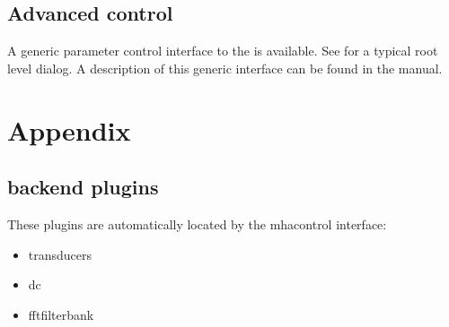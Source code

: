 \documentclass[11pt,a4paper,twoside]{article}
\newcommand{\+}{\discretionary{\mbox{\scriptsize$\hookleftarrow$}}{}{}}
\begin{document}

\subsection{Advanced control}\label{sec:advanced}

A generic parameter control interface to the \mha{} is available. See
 for a typical root level dialog.
%
A description of this generic interface can be found in the \mha{}
manual.


\section{Appendix}

\subsection{\mha{} backend plugins}

These plugins are automatically located by the mhacontrol interface:
%
\begin{itemize}
\item transducers
\item dc
\item fftfilterbank
\end{itemize}



\printindex
\end{document}
